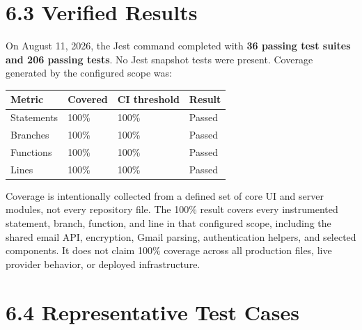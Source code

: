 \documentclass[
]{report}
\begin{document}
\section{6.3 Verified Results}\label{63-verified-results}

On August 11, 2026, the Jest command completed with \textbf{36 passing
test suites and 206 passing tests}. No Jest snapshot tests were present.
Coverage generated by the configured scope was:

\begin{longtable}[]{@{}p{}p{}p{}p{}@{}}
\toprule\noalign{}
Metric & Covered & CI threshold & Result \\
\midrule\noalign{}
\endhead
\bottomrule\noalign{}
\endlastfoot
Statements & 100\% & 100\% & Passed \\
Branches & 100\% & 100\% & Passed \\
Functions & 100\% & 100\% & Passed \\
Lines & 100\% & 100\% & Passed \\
\end{longtable}

Coverage is intentionally collected from a defined set of core UI and
server modules, not every repository file. The 100\% result covers every
instrumented statement, branch, function, and line in that configured
scope, including the shared email API, encryption, Gmail parsing,
authentication helpers, and selected components. It does not claim
100\% coverage across all production files, live provider behavior, or
deployed infrastructure.

\section{6.4 Representative Test
Cases}\label{64-representative-test-cases}
\end{document}

